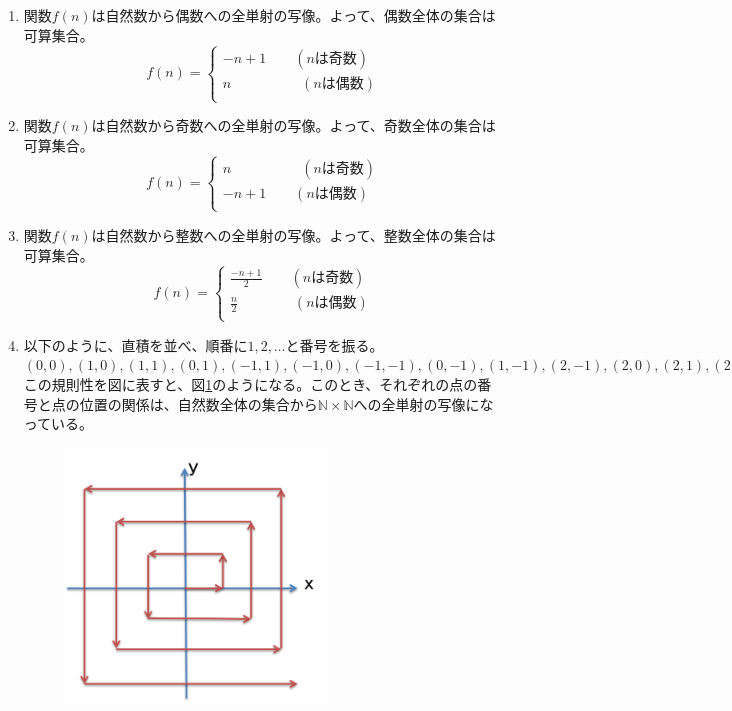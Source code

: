 \documentclass{jsarticle}
\begin{document}
\subsection{}
\begin{enumerate}
\item
関数$f(n)$は自然数から偶数への全単射の写像。よって、偶数全体の集合は可算集合。
\[f(n)=
\begin{cases}
-n+1 \qquad (nは奇数)\\
n \qquad\qquad\quad (nは偶数)\\
\end{cases}
\]

\item
関数$f(n)$は自然数から奇数への全単射の写像。よって、奇数全体の集合は可算集合。
\[f(n)=
\begin{cases}
n \qquad\qquad\quad(nは奇数)\\
-n+1 \qquad (nは偶数)\\
\end{cases}
\]

\item
関数$f(n)$は自然数から整数への全単射の写像。よって、整数全体の集合は可算集合。
\[f(n)=
\begin{cases}
\frac{-n+1}{2} \qquad (nは奇数)\\
\frac{n}{2} \qquad\qquad (nは偶数)\\
\end{cases}
\]

\item
以下のように、直積を並べ、順番に$1,2,\dots$と番号を振る。\\
$(0,0),(1,0),(1,1),(0,1),(-1,1),(-1,0),(-1,-1),(0,-1),(1,-1),(2,-1),(2,0),(2,1),(2,2),(1,2),(0,2),\dots$
この規則性を図に表すと、図\ref{fig:chokuseki}のようになる。このとき、それぞれの点の番号と点の位置の関係は、自然数全体の集合から$\mathbb{N}\times \mathbb{N}$への全単射の写像になっている。
\begin{figure}[htbp]
  \begin{center}
    \includegraphics[clip,width=7.0cm]{fig1.png}
    \caption{}
    \label{fig:chokuseki}
  \end{center}
\end{figure}


\end{enumerate}
\end{document}
